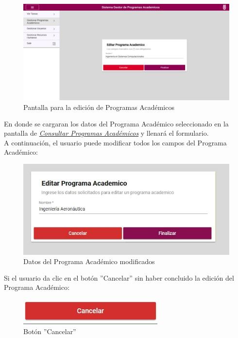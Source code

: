         \begin{figure}[H]
        	\centering
        	\hypertarget{editarpa}{\includegraphics[width=0.7\linewidth]{images/SP3/EditarPA}}
        	\caption{Pantalla para la edición de Programas Académicos}
        	\label{editarpa}
        \end{figure}

        En donde se cargaran los datos del Programa Académico seleccionado en la pantalla de \hyperlink{consultarpa}{\textit{Consultar Programas Académicos}} y llenará el formulario.\\

        A continuación, el usuario puede modificar todos los campos del Programa Académico:
        \begin{figure}[H]
        	\centering
        	\hypertarget{modif}{\includegraphics[width=0.7\linewidth]{images/SP3/Editado}}
        	\caption{Datos del Programa Académico modificados}
        	\label{modif}
        \end{figure}

        Si el usuario da clic en el botón ''Cancelar'' sin haber concluido la edición del Programa Académico:

        \begin{figure}[H]
        	\centering
        	\hypertarget{cancel2}{\includegraphics[width=0.7\linewidth]{images/SP3/BtnCancelar}}
        	\caption{Botón ''Cancelar''}
        	\label{cancel2}
        \end{figure}

